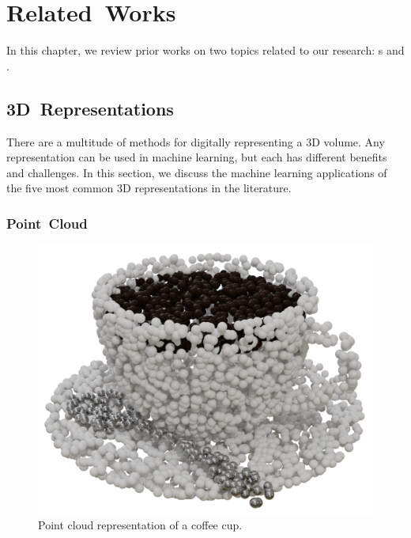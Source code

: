 
\chapter{Related~Works}
\label{chap:related_works}

In this chapter, we review prior works on two topics related to our research: s and .

\section{3D~Representations}
\label{sec:3d_representations}

There are a multitude of methods for digitally representing a 3D volume. Any representation can be used in machine learning, but each has different benefits and challenges. In this section, we discuss the machine learning applications of the five most common 3D representations in the literature.


\subsection{Point~Cloud}
\label{subsec:point_cloud}

\begin{figure}[h]
	\centering
	\includegraphics[scale=0.2]{Images/Point Cloud Cup}
	\caption{Point cloud representation of a coffee cup.}
	\label{fig:point_cloud_cup}
\end{figure}

